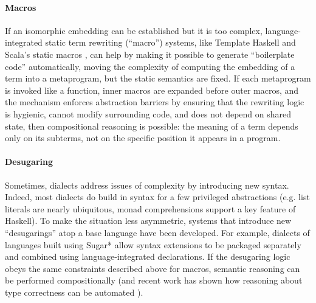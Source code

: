 \documentclass[9pt,preprint]{sigplanconf}
\begin{document}
\paragraph{Macros}
If an isomorphic embedding can be established but it is too complex, language-integrated static term rewriting  (``macro'') systems, like Template Haskell \cite{SheardPeytonJones:Haskell-02} and Scala's static macros \cite{ScalaMacros2013}, can help by making it possible to generate ``boilerplate code'' automatically, moving the complexity of computing the embedding of a term into a metaprogram, but the static semantics are fixed. If each metaprogram is invoked like a function, inner macros are expanded before outer macros, and the mechanism enforces abstraction barriers by ensuring that the rewriting logic is hygienic, cannot modify surrounding code, and does not depend on shared state, then compositional reasoning is possible: the meaning of a term depends only on its subterms, not on the specific position it appears in a program.%

\paragraph{Desugaring}\label{desugaring}
Sometimes, dialects address issues of complexity by introducing new syntax. Indeed, most dialects do build in syntax for a few privileged abstractions (e.g. list literals are nearly ubiquitous, monad comprehensions support a key feature of Haskell). %
To make the situation less asymmetric, systems that introduce new  ``desugarings'' atop a base language have been developed. For example, %
dialects of languages built using Sugar* \cite{erdweg2013framework} allow syntax extensions to be packaged separately and combined using language-integrated declarations. If the desugaring logic obeys the same constraints described above for macros, semantic reasoning can be performed compositionally (and recent work has shown how reasoning about type correctness can be automated \cite{conf/icfp/LorenzenE13}). 
\end{document}
